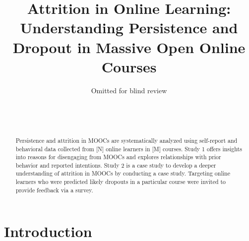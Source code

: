 \documentclass{sigchi}\usepackage[]{graphicx}\usepackage[]{color}
\begin{document}
\title{Attrition in Online Learning: Understanding Persistence and Dropout in Massive Open Online Courses}

\author{
  \alignauthor Omitted for blind review\\
  \\
  \\
  \\
}

\maketitle

\begin{abstract}
Persistence and attrition in MOOCs are systematically analyzed using self-report and behavioral data collected from [N] online learners in [M] courses. Study 1 offers insights into reasons for disengaging from MOOCs and explores relationships with prior behavior and reported intentions. Study 2 is a case study to develop a deeper understanding of attrition in MOOCs by conducting a case study. Targeting online learners who were predicted likely dropouts in a particular course were invited to provide feedback via a survey. 
\end{abstract}



\section{Introduction}
\end{document}
